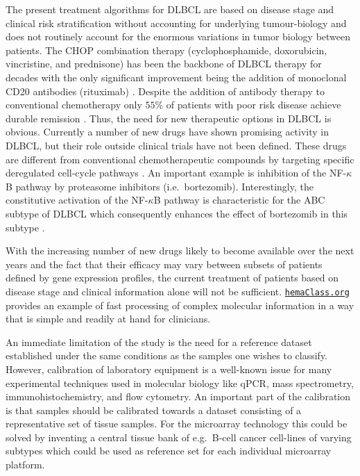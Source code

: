 \documentclass[twocolumn]{bmcart}%
\newcommand{\hemaClass}{\href{http://hemaClass.org}{\texttt{hemaClass.org}}}
\begin{document}
The present treatment algorithms for DLBCL are based on disease stage and clinical risk stratification without accounting for underlying tumour-biology \cite{Schmoll2012} and does not routinely account for the enormous variations in tumor biology between patients.
The CHOP combination therapy (cyclophosphamide, doxorubicin, vincristine, and prednisone) has been the backbone of DLBCL therapy for decades with the only significant improvement being the addition of monoclonal CD20 antibodies (rituximab) \cite{Coiffier2002a}.
Despite the addition of antibody therapy to conventional chemotherapy only $55\%$ of patients with poor risk disease achieve durable remission \cite{Ziepert2010}.
Thus, the need for new therapeutic options in DLBCL is obvious.
Currently a number of new drugs have shown promising activity in DLBCL, but their role outside clinical trials have not been defined.
These drugs are different from conventional chemotherapeutic compounds by targeting specific deregulated cell-cycle pathways \citep{Friedberg2011}.
An important example is inhibition of the NF-$\kappa$B pathway by proteasome inhibitors (i.e.\ bortezomib).
Interestingly, the constitutive activation of the NF-$\kappa$B pathway is characteristic for the ABC subtype of DLBCL which consequently enhances the effect of bortezomib in this subtype \citep{Dunleavy2009}.

With the increasing number of new drugs likely to become available over the next years and the fact that their efficacy may vary between subsets of patients defined by gene expression profiles, the current treatment of patients based on disease stage and clinical information alone will not be sufficient.
\hemaClass{} provides an example of fast processing of complex molecular information in a way that is simple and readily at hand for clinicians.

An immediate limitation of the study is the need for a reference dataset established under the same conditions as the samples one wishes to classify.
However, calibration of laboratory equipment is a well-known issue for many experimental techniques used in molecular biology like qPCR, mass spectrometry, immunohistochemistry, and flow cytometry.
An important part of the calibration is that samples should be calibrated towards a dataset consisting of a representative set of tissue samples.
For the microarray technology this could be solved by inventing a central tissue bank of e.g.\ B-cell cancer cell-lines of varying subtypes which could be used as reference set for each individual microarray platform.
\end{document}
